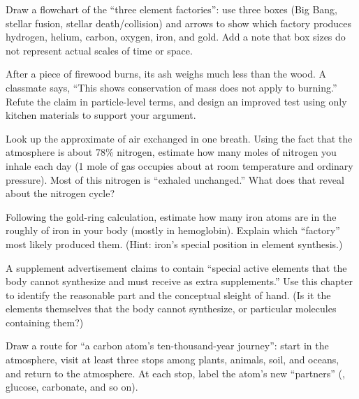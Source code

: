 \begin{sikaoti}
\item Draw a flowchart of the ``three element factories'': use three boxes (Big Bang, stellar fusion, stellar death/collision) and arrows to show which factory produces hydrogen, helium, carbon, oxygen, iron, and gold. Add a note that box sizes do not represent actual scales of time or space.
\item After a piece of firewood burns, its ash weighs much less than the wood. A classmate says, ``This shows conservation of mass does not apply to burning.'' Refute the claim in particle-level terms, and design an improved test using only kitchen materials to support your argument.
\item Look up the approximate  of air exchanged in one breath. Using the fact that the atmosphere is about 78\% nitrogen, estimate how many moles of nitrogen you inhale each day (1 mole of gas occupies about  at room temperature and ordinary pressure). Most of this nitrogen is ``exhaled unchanged.'' What does that reveal about the nitrogen cycle?
\item Following the gold-ring calculation, estimate how many iron atoms are in the roughly  of iron in your body (mostly in hemoglobin). Explain which ``factory'' most likely produced them. (Hint: iron's special position in element synthesis.)
\item A supplement advertisement claims to contain ``special active elements that the body cannot synthesize and must receive as extra supplements.'' Use this chapter to identify the reasonable part and the conceptual sleight of hand. (Is it the elements themselves that the body cannot synthesize, or particular molecules containing them?)
\item Draw a route for ``a carbon atom's ten-thousand-year journey'': start in the atmosphere, visit at least three stops among plants, animals, soil, and oceans, and return to the atmosphere. At each stop, label the atom's new ``partners'' (, glucose, carbonate, and so on).
\end{sikaoti}

